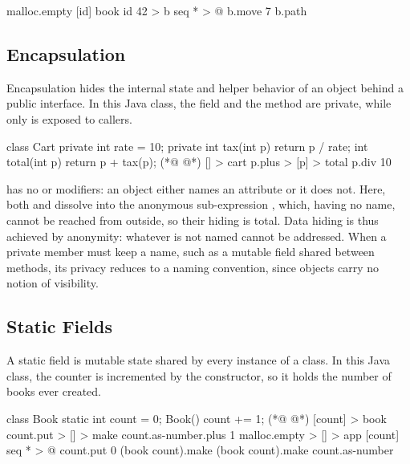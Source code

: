 \begin{ffcode}
malloc.empty
  [id]
    book id 42 > b
    seq * > @
      b.move 7
      b.path
\end{ffcode}

\subsection{Encapsulation}
\label{sec:encapsulation}

Encapsulation hides the internal state and helper behavior of an object
  behind a public interface.
In this Java class, the field  and the method  are private,
  while only  is exposed to callers.

\begin{ffcode}
class Cart {
  private int rate = 10;
  private int tax(int p) {
    return p / rate; }
  int total(int p) {
    return p + tax(p); } }
(*@ \ffcolumnbreak @*)
[] > cart
  p.plus > [p] > total
    p.div 10
\end{ffcode}

\eolang{} has no  or  modifiers: an object either
  names an attribute or it does not.
Here, both  and  dissolve into the anonymous sub-expression
  , which, having no name, cannot be reached from outside,
  so their hiding is total.
Data hiding is thus achieved by anonymity: whatever is not named cannot
  be addressed.
When a private member must keep a name, such as a mutable field shared
  between methods, its privacy reduces to a naming convention, since
  objects carry no notion of visibility.

\subsection{Static Fields}
\label{sec:staticfields}

A static field is mutable state shared by every instance of a class.
In this Java class, the counter  is incremented by the constructor,
  so it holds the number of books ever created.

\begin{ffcode}
class Book {
  static int count = 0;
  Book() {
    count += 1;
  }
}
(*@ \ffcolumnbreak @*)
[count] > book
  count.put > [] > make
    count.as-number.plus 1
malloc.empty > [] > app
  [count]
    seq * > @
      count.put 0
      (book count).make
      (book count).make
      count.as-number
\end{ffcode}

